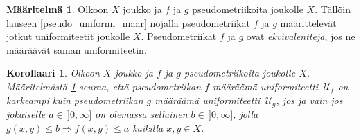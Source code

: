 \documentclass[12pt,a4paper,leqno]{report}
\newcommand{\U}{\,\mathcal{U}}
\theoremstyle{plain}
\newtheorem{kor}[equation]{Korollaari}
\theoremstyle{definition}
\newtheorem{maar}[equation]{Määritelmä}
\theoremstyle{remark}
\begin{document}
\begin{maar}\label{pseudo_equiv}
Olkoon $X$ joukko ja $f$ ja $g$ pseudometriikoita joukolle $X$. 
Tällöin lauseen \ref{pseudo_uniformi_maar} nojalla 
pseudometriikat $f$ ja $g$ määrittelevät jotkut uniformiteetit joukolle $X$.
Pseudometriikat $f$ ja $g$ ovat \emph{ekvivalentteja}, jos ne määräävät saman uniformiteetin.
\end{maar}
\begin{kor}
Olkoon $X$ joukko ja $f$ ja $g$ pseudometriikoita joukolle $X$. 
Määritelmästä \ref{pseudo_equiv} seuraa, että pseudometriikan $f$ määräämä uniformiteetti 
$\U_f$ 
on karkeampi kuin pseudometriikan $g$ määräämä uniformiteetti $\U_g$, jos ja vain jos jokaiselle 
$a\in\,]0,\infty]$ on olemassa sellainen $b\in\,]0,\infty]$, jolla $g(x,y)\leq b \Rightarrow f(x,y)\leq a$ kaikilla $x,y\in X$.


\end{kor}
\end{document}
